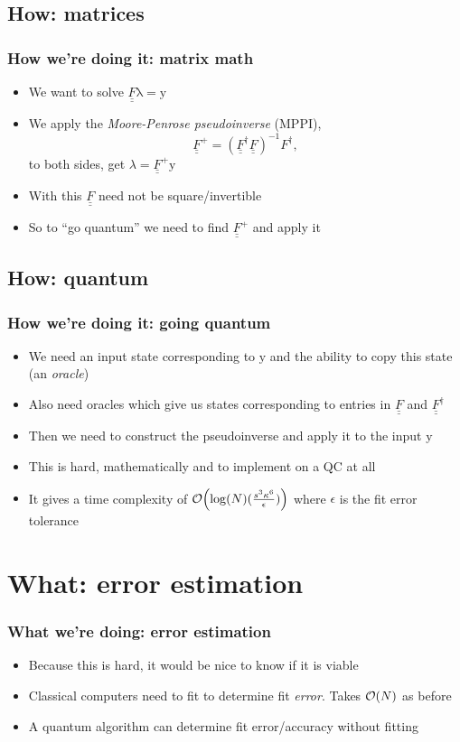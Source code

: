 \documentclass[10pt]{beamer}
\newcommand{\dul}[1]{\underline{\underline{#1}}}
\newcommand{\bv}[1]{\bm{\mathrm{#1}}}
\begin{document}
\subsection{How: matrices}
\begin{frame}
  \frametitle{How we're doing it: matrix math}
  \begin{itemize}
    \item We want to solve $\dul{F}\bv{\lambda}=\bv{y}$
    \item We apply the \emph{Moore-Penrose pseudoinverse} (MPPI), $$\dul{F}^+=(\dul{F}^\dagger\dul{F})^{-1}F^\dagger,$$ to both sides, get $\lambda=\dul{F}^+\bv{y}$
    \item With this $\dul{F}$ need not be square/invertible
    \item So to ``go quantum'' we need to find $\dul{F}^+$ and apply it
  \end{itemize}
\end{frame}
\subsection{How: quantum}
\begin{frame}
  \frametitle{How we're doing it: going quantum}
  \begin{itemize}
    \item We need an input state corresponding to $\bv{y}$ and the ability to copy this state (an \emph{oracle})
    \item Also need oracles which give us states corresponding to entries in $\dul{F}$ and $\dul{F}^\dagger$
    \item Then we need to construct the pseudoinverse and apply it to the input $\bv{y}$
    \item This is hard, mathematically and to implement on a QC at all
    \item It gives a time complexity of $\order{\log(N)(\frac{s^3\kappa^6}{\epsilon})}$ where $\epsilon$ is the fit error tolerance
  \end{itemize}
\end{frame}

\section{What: error estimation}
\begin{frame}
  \frametitle{What we're doing: error estimation}
  \begin{itemize}
    \item Because this is hard, it would be nice to know if it is viable
    \item Classical computers need to fit to determine fit \emph{error}. Takes $\order{N}$ as before
    \item A quantum algorithm can determine fit error/accuracy without fitting
  \end{itemize}
\end{frame}
\end{document}
